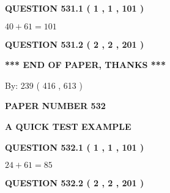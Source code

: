 \documentclass[12pt]{article}
\begin{document}
   
  
\vspace{0.2in}
  
{\textbf{\Large{QUESTION
531.1 
 ( 1 , 1 , 101 )
}}}
  
  
 
 

$ %
40 +  %
61=   %
101$
 
 
  
\vspace{0.2in}
  
{\textbf{\Large{QUESTION
531.2 
 ( 2 , 2 , 201 )
}}}
  
  
   
   
 \vspace{0.2in}
 
   
   
   
   
\vspace{1.0in} 
{\textbf{\large{ *** END OF PAPER, THANKS *** }}} 
   
   
\hspace{1.0in} By: 
 239 ( 416 ,  613 )
   
   
   
   
\newpage 
\setcounter{page}{ 
   532001 } 
   
   
   
   
 {\textbf{ \Large{ PAPER NUMBER  532  }}}
   
   
\vspace{0.2in}
   
   
   
   
   
   
 \vspace{0.2in}
{\LARGE {\textbf{ A QUICK TEST EXAMPLE}}}
   
   
  
\vspace{0.2in}
  
{\textbf{\Large{QUESTION
532.1 
 ( 1 , 1 , 101 )
}}}
  
  
 
 

$ %
24 +  %
61=   %
85$
 
 
  
\vspace{0.2in}
  
{\textbf{\Large{QUESTION
532.2 
 ( 2 , 2 , 201 )
}}}
  
  
   
\end{document}
